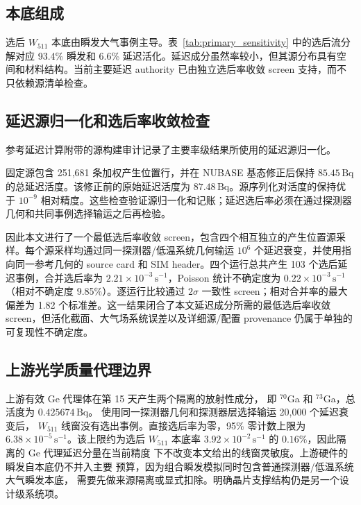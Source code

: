 \documentclass[preprint,12pt]{elsarticle}
\newcommand{\cps}{\,\mathrm{s^{-1}}}
\newcommand{\wii}{W_{511}}
\begin{document}
\subsection{本底组成}
\label{subsec:bgcomp}

选后 $\wii$ 本底由瞬发大气事例主导。表~\ref{tab:primary_sensitivity} 中的选后流分解对应 93.4\% 瞬发和 6.6\% 延迟活化。延迟成分虽然率较小，但其源分布具有空间和材料结构。当前主要延迟 authority 已由独立选后率收敛 screen 支持，而不只依赖源清单检查。

\subsection{延迟源归一化和选后率收敛检查}
\label{subsec:convergence}

参考延迟计算附带的源构建审计记录了主要率级结果所使用的延迟源归一化。

固定源包含 251,681 条加权产生位置行，并在 NUBASE 基态修正后保持 $85.45\,\mathrm{Bq}$ 的总延迟活度。该修正前的原始延迟活度为 $87.48\,\mathrm{Bq}$。源序列化对活度的保持优于 $10^{-9}$ 相对精度。这些检查验证源归一化和记账；延迟选后率必须在通过探测器几何和共同事例选择输运之后再检验。

因此本文进行了一个最低选后率收敛 screen，包含四个相互独立的产生位置源采样。每个源采样均通过同一探测器/低温系统几何输运 $10^6$ 个延迟衰变，并使用指向同一参考几何的 source card 和 SIM header。四个运行总共产生 103 个选后延迟事例，合并选后率为 $2.21\times10^{-3}\cps$，Poisson 统计不确定度为 $0.22\times10^{-3}\cps$（相对不确定度 9.85\%）。逐运行比较通过 $2\sigma$ 一致性 screen；相对合并率的最大偏差为 1.82 个标准差。这一结果闭合了本文延迟成分所需的最低选后率收敛 screen，但活化截面、大气场系统误差以及详细源/配置 provenance 仍属于单独的可复现性不确定度。

\subsection{上游光学质量代理边界}
\label{subsec:upstream_optics_background}

上游有效 Ge 代理体在第 15 天产生两个隔离的放射性成分，
即 $^{70}$Ga 和 $^{73}$Ga，总活度为 $0.425674\,\mathrm{Bq}$。
使用同一探测器几何和探测器层选择输运 20,000 个延迟衰变后，
$\wii$ 线窗没有选出事例。直接选后率为零，95\% 零计数上限为
$6.38\times10^{-5}\cps$。该上限约为选后 $\wii$ 本底率
$3.92\times10^{-2}\cps$ 的 $0.16\%$，因此隔离的 Ge 代理延迟分量在当前精度
下不改变本文给出的线窗灵敏度。上游硬件的瞬发自本底仍不并入主要
预算，因为组合瞬发模拟同时包含普通探测器/低温系统大气瞬发本底，
需要先做来源隔离或显式扣除。明确晶片支撑结构仍是另一个设计级系统项。
\end{document}
